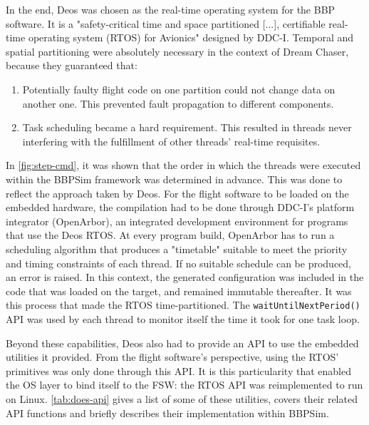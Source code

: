 {In the end, Deos was chosen as the real-time operating system for the BBP software. It is a "safety-critical time and space partitioned [...], certifiable real-time operating system (RTOS) for Avionics" designed by DDC-I\cite{on:ddci}. Temporal and spatial partitioning were absolutely necessary in the context of Dream Chaser, because they guaranteed that:
\begin{enumerate}
	\item Potentially faulty flight code on one partition could not change data on another one. This prevented fault propagation to different components\cite{reiger}.
	\item Task scheduling became a hard requirement. This resulted in threads never interfering with the fulfillment of other threads' real-time requisites\cite{rufino}.
\end{enumerate}

In \autoref{fig:step-cmd}, it was shown that the order in which the threads were executed within the \gls{BBPSim} framework was determined in advance. This was done to reflect the approach taken by Deos. For the flight software to be loaded on the embedded hardware, the compilation had to be done through DDC-I's platform integrator (OpenArbor), an integrated development environment for programs that use the Deos RTOS. At every program build, OpenArbor has to run a scheduling algorithm that produces a "timetable" suitable to meet the priority and timing constraints of each thread. If no suitable schedule can be produced, an error is raised. In this context, the generated configuration was included in the code that was loaded on the target, and remained immutable thereafter. It was this process that made the RTOS time-partitioned. The \texttt{waitUntilNextPeriod()} API was used by each thread to monitor itself the time it took for one task loop. 

Beyond these capabilities, Deos also had to provide an API to use the embedded utilities it provided. From the flight software's perspective, using the RTOS' primitives was only done through this API. It is this particularity that enabled the OS layer to bind itself to the FSW: the RTOS API was reimplemented to run on Linux. \autoref{tab:does-api} gives a list of some of these utilities, covers their related API functions and briefly describes their implementation within \gls{BBPSim}. 

}

